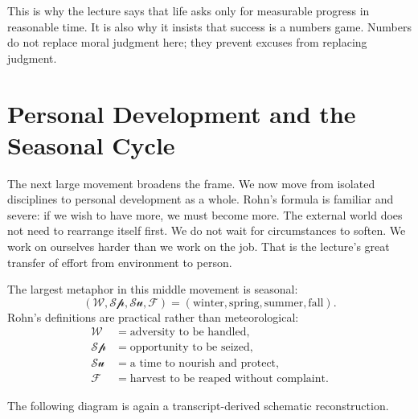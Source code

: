 This is why the lecture says that life asks only for measurable progress in reasonable time. It is also why it insists that success is a numbers game. Numbers do not replace moral judgment here; they prevent excuses from replacing judgment.

\section{Personal Development and the Seasonal Cycle}

The next large movement broadens the frame. We now move from isolated disciplines to personal development as a whole. Rohn's formula is familiar and severe: if we wish to have more, we must become more. The external world does not need to rearrange itself first. We do not wait for circumstances to soften. We work on ourselves harder than we work on the job. That is the lecture's great transfer of effort from environment to person.

The largest metaphor in this middle movement is seasonal:
\begin{equation}
(\mathcal W,\mathcal{Sp},\mathcal{Su},\mathcal F)
=
(\text{winter},\text{spring},\text{summer},\text{fall}).
\end{equation}
Rohn's definitions are practical rather than meteorological:
\begin{align}
\mathcal W &= \text{adversity to be handled},\\
\mathcal{Sp} &= \text{opportunity to be seized},\\
\mathcal{Su} &= \text{a time to nourish and protect},\\
\mathcal F &= \text{harvest to be reaped without complaint}.
\end{align}

The following diagram is again a transcript-derived schematic reconstruction.

